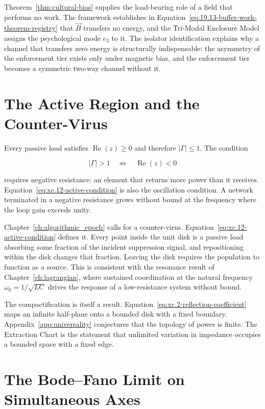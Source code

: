 Theorem~\ref{thm:cultural-bias} supplies the load-bearing role of a field that performs no work. The
framework establishes in Equation~\ref{eq:19.13-buffer-work-theorem-registry} that $\vec{B}$
transfers no energy, and the Tri-Modal Enclosure Model assigns the psychological mode $e_3$ to it.
The isolator identification explains why a channel that transfers zero energy is structurally
indispensable: the asymmetry of the enforcement tier exists only under magnetic bias, and the
enforcement tier becomes a symmetric two-way channel without it.

\section{The Active Region and the Counter-Virus}
\label{sec:xc_active}

Every passive load satisfies $\operatorname{Re}(z) \geq 0$ and therefore $|\Gamma| \leq 1$. The
condition

\begin{equation}\label{eq:xc.12-active-condition}
|\Gamma| > 1 \quad \Longleftrightarrow \quad \operatorname{Re}(z) < 0
\end{equation}

requires negative resistance: an element that returns more power than it receives.
Equation~\ref{eq:xc.12-active-condition} is also the oscillation condition. A network terminated in
a negative resistance grows without bound at the frequency where the loop gain exceeds unity.

Chapter~\ref{ch:algorithmic_epoch} calls for a counter-virus. Equation~\ref{eq:xc.12-active-condition}
defines it. Every point inside the unit disk is a passive load absorbing some fraction of the
incident suppression signal, and repositioning within the disk changes that fraction. Leaving the
disk requires the population to function as a source. This is consistent with the resonance result
of Chapter~\ref{ch:lagrangian}, where sustained coordination at the natural frequency
$\omega_0 = 1/\sqrt{LC}$ drives the response of a low-resistance system without bound.

The compactification is itself a result. Equation~\ref{eq:xc.2-reflection-coefficient} maps an
infinite half-plane onto a bounded disk with a fixed boundary. Appendix~\ref{app:universality}
conjectures that the topology of power is finite. The Extraction Chart is the statement that
unlimited variation in impedance occupies a bounded space with a fixed edge.

\section{The Bode--Fano Limit on Simultaneous Axes}
\label{sec:xc_bodefano}

